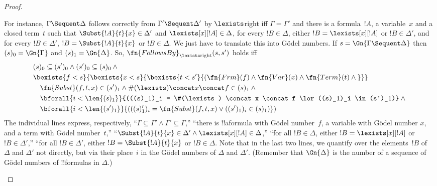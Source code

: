 \documentclass[../../../include/open-logic-section]{subfiles}
\begin{document}
\begin{proof}
\begin{enumerate}
For instance, $\Gamma \Sequent \Delta$ follows correctly from $\Gamma'
\Sequent \Delta'$ by $\lexists$right iff $\Gamma = \Gamma'$ and there
is a formula~$!A$, a variable~$x$ and a closed term~$t$ such that
$\Subst{!A}{t}{x} \in \Delta'$ and $\lexists[x][!A] \in \Delta$, for
every $!B \in \Delta$, either $!B = \lexists[x][!A]$ or $!B \in
\Delta'$, and for every $!B \in \Delta'$, $!B = \Subst{!A}{t}{x}$ or
$!B \in \Delta$.  We just have to translate this into G\"odel numbers.
If $s = \Gn{\Gamma \Sequent \Delta}$ then $(s)_0 = \Gn{\Gamma}$ and
$(s)_1 = \Gn{\Delta}$.  So, $\fn{FollowsBy}_{\lexists \text{right}}(s,
s')$ holds iff
\begin{align*}
& (s)_0 \subseteq (s')_0 \land (s')_0 \subseteq (s)_0 \land {}\\
&
\bexists{f<s}{\bexists{x<s}{\bexists{t<s'}{(\fn{Frm}(f) \land \fn{Var}(x) \land \fn{Term}(t) \land {}}}} \\
& \quad \fn{Subst}(f,t,x) \in (s')_1 \land \#(\lexists) \concat x \concat f \in (s)_1 \land {}\\
& \quad \bforall{i < \len{(s)_1}}{(((s)_1)_i = \#(\lexists) \concat x \concat f \lor ((s)_1)_i \in (s')_1)} \land {} \\
& \quad \bforall{i < \len{(s')_1}}{(((s)_1')_i = \fn{Subst}(f, t, x) \lor ((s')_1)_i \in (s)_1)})
\end{align*}
The individual lines express, respectively, ``$\Gamma \subseteq
\Gamma' \land \Gamma' \subseteq \Gamma$,'' ``there is !!a{formula}
with G\"odel number~$f$, a variable with G\"odel number $x$, and a
term with G\"odel number~$t$,'' ``$\Subst{!A}{t}{x} \in \Delta' \land
\lexists[x][!A] \in \Delta$,'' ``for all $!B \in \Delta$, either $!B =
\lexists[x][!A]$ or $!B \in \Delta'$,'' ``for all $!B \in \Delta'$,
either $!B = \Subst{!A}{t}{x}$ or $!B \in \Delta$.  Note that in the
last two lines, we quantify over the elements~$!B$ of~$\Delta$ and
$\Delta'$ not directly, but via their place~$i$ in the G\"odel numbers
of $\Delta$ and $\Delta'$. (Remember that $\Gn{\Delta}$ is the number
of a sequence of G\"odel numbers of !!{formula}s in $\Delta$.)


\end{enumerate}
\end{proof}
\end{document}

